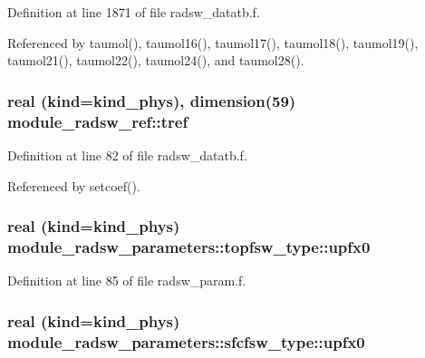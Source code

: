 Definition at line 1871 of file radsw\+\_\+datatb.\+f.



Referenced by taumol(), taumol16(), taumol17(), taumol18(), taumol19(), taumol21(), taumol22(), taumol24(), and taumol28().

\subsubsection[{\texorpdfstring{tref}{tref}}]{\setlength{\rightskip}{0pt plus 5cm}real (kind=kind\+\_\+phys), dimension(59) module\+\_\+radsw\+\_\+ref\+::tref}\hypertarget{group__module__radsw__main_ga449fffa7047caa0fba6c166c26f7dbbd}{}\label{group__module__radsw__main_ga449fffa7047caa0fba6c166c26f7dbbd}


Definition at line 82 of file radsw\+\_\+datatb.\+f.



Referenced by setcoef().

\subsubsection[{\texorpdfstring{upfx0}{upfx0}}]{\setlength{\rightskip}{0pt plus 5cm}real (kind=kind\+\_\+phys) module\+\_\+radsw\+\_\+parameters\+::topfsw\+\_\+type\+::upfx0}\hypertarget{group__module__radsw__main_ga992c82c935dcb4d6269c905fc184cf48}{}\label{group__module__radsw__main_ga992c82c935dcb4d6269c905fc184cf48}


Definition at line 85 of file radsw\+\_\+param.\+f.

\subsubsection[{\texorpdfstring{upfx0}{upfx0}}]{\setlength{\rightskip}{0pt plus 5cm}real (kind=kind\+\_\+phys) module\+\_\+radsw\+\_\+parameters\+::sfcfsw\+\_\+type\+::upfx0}\hypertarget{group__module__radsw__main_ga6bfa85d5917ebc4ebc4ef079e3cf3eca}{}\label{group__module__radsw__main_ga6bfa85d5917ebc4ebc4ef079e3cf3eca}


